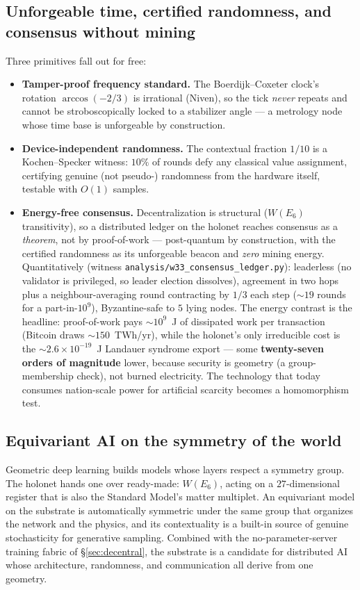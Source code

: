 \documentclass[11pt]{article}
\begin{document}
\subsection{Unforgeable time, certified randomness, and consensus without mining}
Three primitives fall out for free:
\begin{itemize}[leftmargin=1.4em]
\item \textbf{Tamper-proof frequency standard.} The Boerdijk--Coxeter clock's rotation $\arccos(-2/3)$
is irrational (Niven), so the tick \emph{never} repeats and cannot be stroboscopically locked to a
stabilizer angle --- a metrology node whose time base is unforgeable by construction.
\item \textbf{Device-independent randomness.} The contextual fraction $1/10$ is a Kochen--Specker
witness: $10\%$ of rounds defy any classical value assignment, certifying genuine (not
pseudo-) randomness from the hardware itself, testable with $O(1)$ samples.
\item \textbf{Energy-free consensus.} Decentralization is structural ($W(E_6)$ transitivity), so a
distributed ledger on the holonet reaches consensus as a \emph{theorem}, not by proof-of-work ---
post-quantum by construction, with the certified randomness as its unforgeable beacon and \emph{zero}
mining energy. Quantitatively (witness \texttt{analysis/w33\_consensus\_ledger.py}): leaderless (no
validator is privileged, so leader election dissolves), agreement in two hops plus a neighbour-averaging
round contracting by $1/3$ each step ($\sim19$ rounds for a part-in-$10^9$), Byzantine-safe to $5$ lying
nodes. The energy contrast is the headline: proof-of-work pays $\sim\!10^9$~J of dissipated work per
transaction (Bitcoin draws $\sim\!150$~TWh/yr), while the holonet's only irreducible cost is the
$\sim\!2.6\times10^{-19}$~J Landauer syndrome export --- some \textbf{twenty-seven orders of magnitude}
lower, because security is geometry (a group-membership check), not burned electricity. The technology
that today consumes nation-scale power for artificial scarcity becomes a homomorphism test.
\end{itemize}

\subsection{Equivariant AI on the symmetry of the world}
Geometric deep learning builds models whose layers respect a symmetry group. The holonet hands one over
ready-made: $W(E_6)$, acting on a $27$-dimensional register that is also the Standard Model's matter
multiplet. An equivariant model on the substrate is automatically symmetric under the same group that
organizes the network and the physics, and its contextuality is a built-in source of genuine
stochasticity for generative sampling. Combined with the no-parameter-server training fabric of
\S\ref{sec:decentral}, the substrate is a candidate for distributed AI whose architecture, randomness,
and communication all derive from one geometry.
\end{document}
